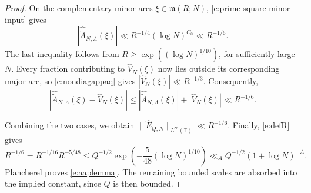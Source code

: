 \documentclass[12pt,reqno]{amsart}
\numberwithin{equation}{section}
\theoremstyle{definition}
\theoremstyle{remark}
\begin{document}
\begin{proof}
On the complementary minor arcs
\(\xi\in\mathfrak m(R;N)\),
\eqref{e:prime-square-minor-input} gives
\[
 |\widehat{\widetilde A}_{N,\Lambda}(\xi)|
 \ll R^{-1/4}(\log N)^{C_0}
 \ll R^{-1/6}.
\]
The last inequality follows from
\(R\geq\exp((\log N)^{1/10})\), for sufficiently large \(N\).
Every fraction contributing to \(\widehat V_N(\xi)\) now lies
outside its corresponding major arc, so \eqref{e:nondiagappaq} gives \(|\widehat V_N(\xi)|\ll R^{-1/3}\).
Consequently,
\[
 |\widehat{\widetilde A}_{N,\Lambda}(\xi)-\widehat V_N(\xi)| \leq |\widehat{\widetilde A}_{N,\Lambda}(\xi)|+|\widehat V_N(\xi)| 
 \ll R^{-1/6}.
\]

Combining the two cases, we obtain
\(\|\widehat E_{Q,N}\|_{L^\infty(\mathbb T)}\ll R^{-1/6}\).
Finally, \eqref{e:defR} gives
\[
 R^{-1/6}=R^{-1/16}R^{-5/48}
 \leq Q^{-1/2}
 \exp\left(-\frac5{48}(\log N)^{1/10}\right)
 \ll_A Q^{-1/2}(1+\log N)^{-A}.
\]
Plancherel proves \eqref{e:aaplemma}.
The remaining bounded scales are absorbed into the implied
constant, since \(Q\) is then bounded.
\end{proof}


\end{document}
